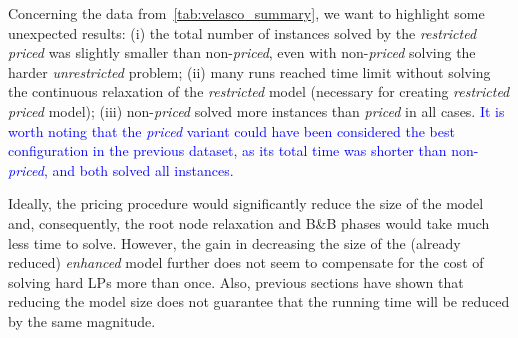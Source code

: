 \documentclass[ppgc,tese,english,formais,babel]{iiufrgs}
\newif\iffinalversion
\newcommand{\newtext}[1]{\iffinalversion%
#1%
\else%
\textcolor{blue}{#1}%
\fi%
}
\begin{document}
Concerning the data from~\cref{tab:velasco_summary}, we want to highlight some unexpected results:
(i) the total number of instances solved by the \emph{restricted priced} was slightly smaller than non-\emph{priced}, even with non-\emph{priced} solving the harder \emph{unrestricted} problem;
(ii) many runs reached time limit without solving the continuous relaxation of the \emph{restricted} model (necessary for creating \emph{restricted priced} model);
(iii) non-\emph{priced} solved more instances than \emph{priced} in all cases.
\newtext{It is worth noting that the \emph{priced} variant could have been considered the best configuration in the previous dataset, as its total time was shorter than non-\emph{priced}, and both solved all instances.}
Ideally, the pricing procedure would significantly reduce the size of the model and, consequently, the root node relaxation and B\&B phases would take much less time to solve.
However, the gain in decreasing the size of the (already reduced) \emph{enhanced} model further does not seem to compensate for the cost of solving hard LPs more than once.
Also, previous sections have shown that reducing the model size does not guarantee that the running time will be reduced by the same magnitude.
\end{document}
